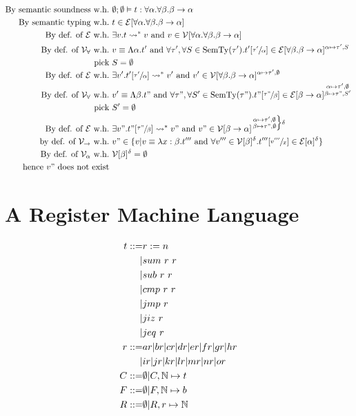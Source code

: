 \documentclass{article}
\begin{document}
\begin{align*}
    \te{By semantic soundness w.h.} &\ \emptyset;\emptyset\vDash t: \forall\alpha.\forall\beta.\beta\to\alpha \\
    \te{By semantic typing w.h.} &\ t\in\cE[\forall\alpha.\forall\beta.\beta\to\alpha] \\
    \te{By def. of $\cE$ w.h.} &\ \exists v. t\ls v \AND v \in \V[\forall\alpha.\forall\beta.\beta\to\alpha] \\
    \te{By def. of $\V_\forall$ w.h.} &\ v\equiv \Lambda \alpha.t'\AND \forall\tau',\forall S\in\te{SemTy}(\tau'). t'[\sfrac{\tau'}\alpha] \in \cE[\forall\beta.\beta\to\alpha]^{\alpha\mapsto \tau',S} \\
    \te{pick} &\ S=\emptyset \\
    \te{By def. of $\cE$ w.h.} &\ \exists v'. t'[\sfrac{\tau'}\alpha] \ls v' \AND v'\in\V[\forall\beta.\beta\to\alpha]^{\alpha\mapsto \tau',\emptyset} \\
    \te{By def. of $\V_\forall$ w.h.} &\ v'\equiv \Lambda \beta.t"\AND \forall\tau",\forall S'\in\te{SemTy}(\tau"). t"[\sfrac{\tau"}\beta] \in \cE[\beta\to\alpha]^{\substack{\alpha\mapsto \tau',\emptyset\\\beta\mapsto \tau",S'}} \\
    \te{pick} &\ S'=\emptyset \\
    \te{By def. of $\cE$ w.h.} &\ \exists v".t"[\sfrac{\tau"}\beta]\ls v" \AND v"\in\V[\beta\to\alpha]^{\left.\substack{\alpha\mapsto \tau',\emptyset\\\beta\mapsto \tau",\emptyset}\right\}\delta} \\
    \te{by def. of $\V_\to$ w.h.} &\ v" \in \{v|v\equiv \lam{x:\beta}{t'''} \AND \forall v''' \in\V[\beta]^\delta.t'''[\sfrac{v'''}x]\in\cE[\alpha]^\delta\} \\
    \te{By def. of $\V_\alpha$ w.h.} &\ \V[\beta]^\delta = \emptyset \\
    \te{hence $v"$ does not exist} &\ 
\end{align*}

\newpage
\section{A Register Machine Language}
\begin{align*}
    t ::= & r:=n \\
        |& sum\ r\ r \\
        |& sub\ r\ r \\
        |& cmp\ r\ r \\
        |& jmp\ r \\
        |& jiz\ r \\
        |& jeq\ r \\
    r ::= & ar|br|cr|dr|er|fr|gr|hr \\
        |&ir|jr|kr|lr|mr|nr|or \\
    C ::=& \emptyset | C,\N\mapsto t \\
    F ::=& \emptyset | F,\N\mapsto b \\
    R ::=& \emptyset | R, r\mapsto \N \\
\end{align*}
\end{document}
